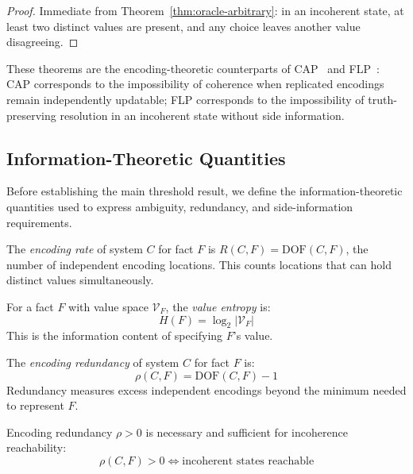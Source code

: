 \begin{proof}
Immediate from Theorem~\ref{thm:oracle-arbitrary}: in an incoherent state, at least two distinct values are present, and any choice leaves another value disagreeing.
\end{proof}

These theorems are the encoding-theoretic counterparts of CAP~\cite{brewer2000cap,gilbert2002cap} and FLP~\cite{flp1985impossibility}: CAP corresponds to the impossibility of coherence when replicated encodings remain independently updatable; FLP corresponds to the impossibility of truth-preserving resolution in an incoherent state without side information.

\subsection{Information-Theoretic Quantities}\label{sec:it-quantities}

Before establishing the main threshold result, we define the information-theoretic quantities used to express ambiguity, redundancy, and side-information requirements.

\begin{definition}\label{def:encoding-rate}
The \emph{encoding rate} of system $C$ for fact $F$ is $R(C, F) = \text{DOF}(C, F)$, the number of independent encoding locations. This counts locations that can hold distinct values simultaneously.
\end{definition}

\begin{definition}\label{def:value-entropy}
For a fact $F$ with value space $\mathcal{V}_F$, the \emph{value entropy} is:
\[
H(F) = \log_2 |\mathcal{V}_F|
\]
This is the information content of specifying $F$'s value.
\end{definition}

\begin{definition}\label{def:redundancy}
The \emph{encoding redundancy} of system $C$ for fact $F$ is:
\[
\rho(C, F) = \text{DOF}(C, F) - 1
\]
Redundancy measures excess independent encodings beyond the minimum needed to represent $F$.
\end{definition}

\begin{theorem}\label{thm:redundancy-incoherence}
Encoding redundancy $\rho > 0$ is necessary and sufficient for incoherence reachability:
\[
\rho(C, F) > 0 \Longleftrightarrow \text{incoherent states reachable}
\]
\end{theorem}

